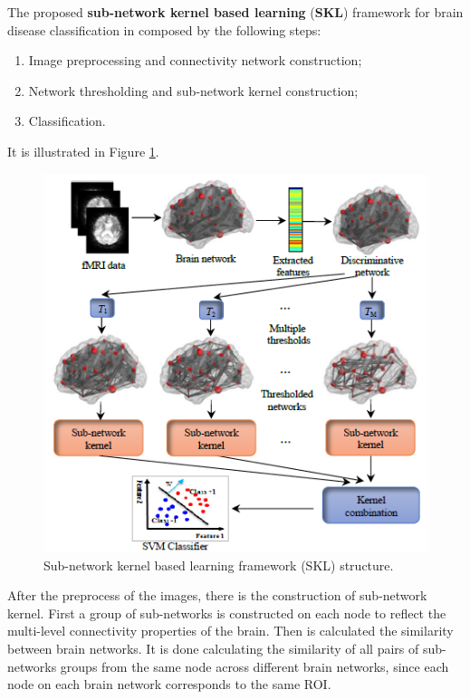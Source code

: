 The proposed \textbf{sub-network kernel based learning} (\textbf{SKL}) framework for brain disease classification in composed by the following steps: 

\begin{enumerate}
	\item Image preprocessing and connectivity network construction;
	\item Network thresholding and sub-network kernel construction;
	\item Classification.
\end{enumerate}

It is illustrated in Figure \ref{fig:diagram15}.
\vspace{0.5cm}

\begin{figure}[htbp]
	\centering
	\includegraphics[scale=0.8]{Immagini/subnetwork1.PNG}
	\caption{Sub-network kernel based learning framework (SKL) structure.}
	\label{fig:diagram15}
\end{figure}

After the preprocess of the images, there is the construction of sub-network kernel. First a group of sub-networks is constructed on each node to reflect the multi-level connectivity properties of the brain. Then is calculated the similarity between brain networks. It is done calculating the similarity of all pairs of sub-networks groups from the same node across different brain networks, since each node on each brain network corresponds to the same ROI. 
\vspace{0.5cm}

